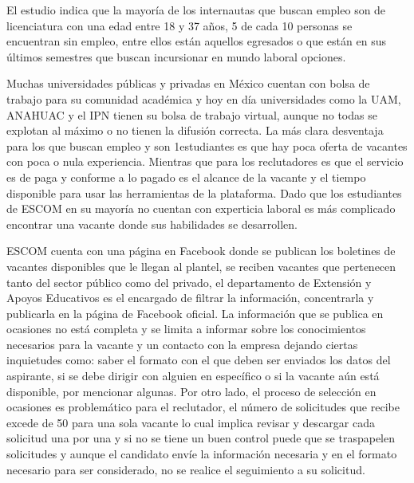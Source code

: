     El estudio indica que la mayoría de los internautas que buscan empleo son de licenciatura con una edad entre 18 y 37
    años, 5 de cada 10 personas se encuentran sin empleo, entre ellos están aquellos egresados o que están en sus últimos
    semestres que buscan incursionar en mundo laboral opciones.
    \newline

    Muchas universidades públicas y privadas en México cuentan con bolsa de trabajo para su comunidad académica y
    hoy en día universidades como la UAM, ANAHUAC y el IPN tienen su bolsa de trabajo virtual, aunque no todas se
    explotan al máximo o no tienen la difusión correcta. La más clara desventaja para los que buscan empleo y son
    1estudiantes es que hay poca oferta de vacantes con poca o nula experiencia. Mientras que para los reclutadores es que
    el servicio es de paga y conforme a lo pagado es el alcance de la vacante y el tiempo disponible para usar las
    herramientas de la plataforma. Dado que los estudiantes de ESCOM en su mayoría no cuentan con experticia laboral
    es más complicado encontrar una vacante donde sus habilidades se desarrollen. 

    ESCOM cuenta con una página en Facebook donde se publican los boletines de vacantes disponibles que le llegan al
    plantel, se reciben vacantes que pertenecen tanto del sector público como del privado, el departamento de Extensión
    y Apoyos Educativos es el encargado de filtrar la información, concentrarla y publicarla en la página de Facebook
    oficial.
    La información que se publica en ocasiones no está completa y se limita a informar sobre los conocimientos necesarios
    para la vacante y un contacto con la empresa dejando ciertas inquietudes como: saber el formato con el que deben ser
    enviados los datos del aspirante, si se debe dirigir con alguien en específico o si la vacante aún está disponible, por
    mencionar algunas.
    Por otro lado, el proceso de selección en ocasiones es problemático para el reclutador, el número de solicitudes que
    recibe excede de 50 para una sola vacante lo cual implica revisar y descargar cada solicitud una por una y si no se
    tiene un buen control puede que se traspapelen solicitudes y aunque el candidato envíe la información necesaria y en
    el formato necesario para ser considerado, no se realice el seguimiento a su solicitud.

